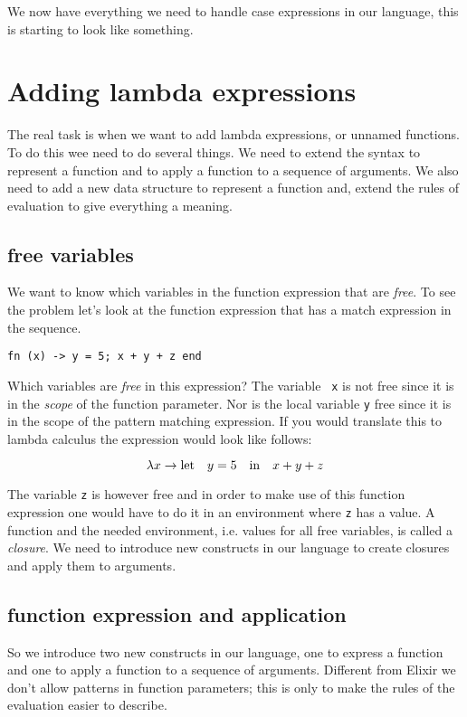 \documentclass[a4paper,11pt]{article}
\begin{document}
We now have everything we need to handle case expressions in our
language, this is starting to look like something.

\section{Adding lambda expressions}

The real task is when we want to add lambda expressions, or unnamed
functions. To do this wee need to do several things. We need to extend
the syntax to represent a function and to apply a function to a
sequence of arguments. We also need to add a new data structure to
represent a function and, extend the rules of evaluation to give
everything a meaning.


\subsection{free variables}

We want to know which variables in the function expression that are
{\em free}. To see the problem let's look at the function expression
that has a match expression in the sequence.

\begin{verbatim}
fn (x) -> y = 5; x + y + z end
\end{verbatim}

Which variables are {\em free} in this expression? The variable {\tt
  x} is not free since it is in the {\em scope} of the function
parameter. Nor is the local variable {\tt y} free since it is in the
scope of the pattern matching expression. If you would
translate this to lambda calculus the expression would look like
follows:

$$ \lambda x \rightarrow {\rm let} \quad y = 5 \quad {\rm in} \quad x + y + z$$

The variable {\tt z} is however free and in order to make use of this
function expression one would have to do it in an environment where
{\tt z} has a value. A function and the needed environment,
i.e. values for all free variables, is called a {\em closure}. We need
to introduce new constructs in our language to create closures and
apply them to arguments.


\subsection{function expression and application}

So we introduce two new constructs in our language, one to express a
function and one to apply a function to a sequence of
arguments. Different from Elixir we don't allow patterns in function
parameters; this is only to make the rules of the evaluation easier to
describe.
\end{document}
